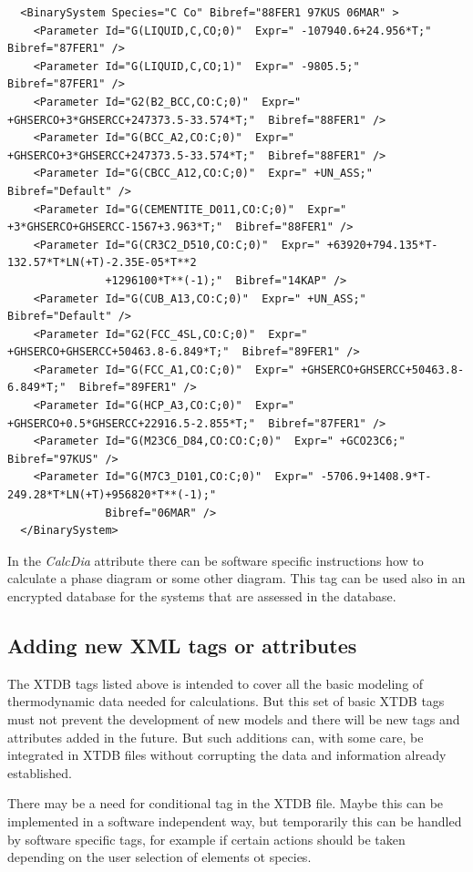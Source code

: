 \documentclass{article}
\begin{document}
{\begin{verbatim}
  <BinarySystem Species="C Co" Bibref="88FER1 97KUS 06MAR" >
    <Parameter Id="G(LIQUID,C,CO;0)"  Expr=" -107940.6+24.956*T;"  Bibref="87FER1" />
    <Parameter Id="G(LIQUID,C,CO;1)"  Expr=" -9805.5;"  Bibref="87FER1" />
    <Parameter Id="G2(B2_BCC,CO:C;0)"  Expr=" +GHSERCO+3*GHSERCC+247373.5-33.574*T;"  Bibref="88FER1" />
    <Parameter Id="G(BCC_A2,CO:C;0)"  Expr=" +GHSERCO+3*GHSERCC+247373.5-33.574*T;"  Bibref="88FER1" />
    <Parameter Id="G(CBCC_A12,CO:C;0)"  Expr=" +UN_ASS;"  Bibref="Default" />
    <Parameter Id="G(CEMENTITE_D011,CO:C;0)"  Expr=" +3*GHSERCO+GHSERCC-1567+3.963*T;"  Bibref="88FER1" />
    <Parameter Id="G(CR3C2_D510,CO:C;0)"  Expr=" +63920+794.135*T-132.57*T*LN(+T)-2.35E-05*T**2
               +1296100*T**(-1);"  Bibref="14KAP" />
    <Parameter Id="G(CUB_A13,CO:C;0)"  Expr=" +UN_ASS;"  Bibref="Default" />
    <Parameter Id="G2(FCC_4SL,CO:C;0)"  Expr=" +GHSERCO+GHSERCC+50463.8-6.849*T;"  Bibref="89FER1" />
    <Parameter Id="G(FCC_A1,CO:C;0)"  Expr=" +GHSERCO+GHSERCC+50463.8-6.849*T;"  Bibref="89FER1" />
    <Parameter Id="G(HCP_A3,CO:C;0)"  Expr=" +GHSERCO+0.5*GHSERCC+22916.5-2.855*T;"  Bibref="87FER1" />
    <Parameter Id="G(M23C6_D84,CO:CO:C;0)"  Expr=" +GCO23C6;"  Bibref="97KUS" />
    <Parameter Id="G(M7C3_D101,CO:C;0)"  Expr=" -5706.9+1408.9*T-249.28*T*LN(+T)+956820*T**(-1);"
               Bibref="06MAR" />
  </BinarySystem>
\end{verbatim}
}

In the {\em CalcDia} attribute there can be software specific
instructions how to calculate a phase diagram or some other diagram.
This tag can be used also in an encrypted database for the systems
that are assessed in the database.

\subsection{Adding new XML tags or attributes}

The XTDB tags listed above is intended to cover all the basic modeling
of thermodynamic data needed for calculations.  But this set of basic
XTDB tags must not prevent the development of new models and there
will be new tags and attributes added in the future.  But such
additions can, with some care, be integrated in XTDB files without
corrupting the data and information already established.

There may be a need for conditional tag in the XTDB file.  Maybe this
can be implemented in a software independent way, but temporarily this
can be handled by software specific tags, for example if certain
actions should be taken depending on the user selection of elements ot
species.
\end{document}
